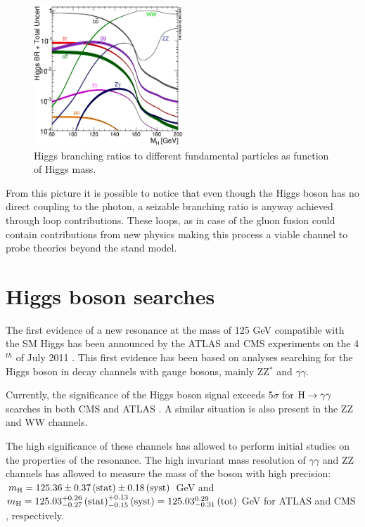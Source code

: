 \begin{figure}
\centering
\includegraphics[width=0.5\textwidth]{1_Introduction_Th_and_Exp/pics/Higgs_BR_LM.eps}
\caption{Higgs branching ratios to different fundamental particles as function of Higgs mass.}
\label{fig:hbr}
\end{figure}

From this picture it is possible to notice that even though the Higgs boson has no direct coupling to the photon, a seizable branching ratio is anyway achieved through loop contributions. These loops, as in case of the gluon fusion could contain contributions from new physics making this process a viable channel to probe theories beyond the stand model.

\section{Higgs boson searches}

The first evidence of a new resonance at the mass of 125 GeV compatible with the SM Higgs has been announced by the ATLAS and CMS experiments on the 4$^{th}$ of July 2011 \cite{Chatrchyan:2013lba}. This first evidence has been based on analyses searching for the Higgs boson in decay channels with gauge bosons, mainly ZZ$^*$ and $\gamma\gamma$.

Currently, the significance of the Higgs boson signal exceeds 5$\sigma$ for $\mathrm{H}\rightarrow\gamma\gamma$ searches in both CMS and ATLAS \cite{Khachatryan:2014ira, ATLASCONF:2014009}. A similar situation is also present in the ZZ and WW channels.

The high significance of these channels has allowed to perform initial studies on the properties of the resonance. The high invariant mass resolution of $\gamma\gamma$ and ZZ channels has allowed to measure the mass of the boson with high precision: $m_{\mathrm{H}} = 125.36 \pm 0.37\, \mathrm{(stat)} \pm 0.18\, \mathrm{(syst)}$ GeV and $m_{\mathrm{H}} = 125.03^{+0.26}_{-0.27} \,\mathrm{(stat)}^{+0.13}_{-0.15}  \,\mathrm{(syst)} = 125.03^{0.29}_{-0.31} \, \mathrm{(tot)}$ GeV for ATLAS \cite{Aad:2014aba} and CMS \cite{CMS:2014ega}, respectively.

